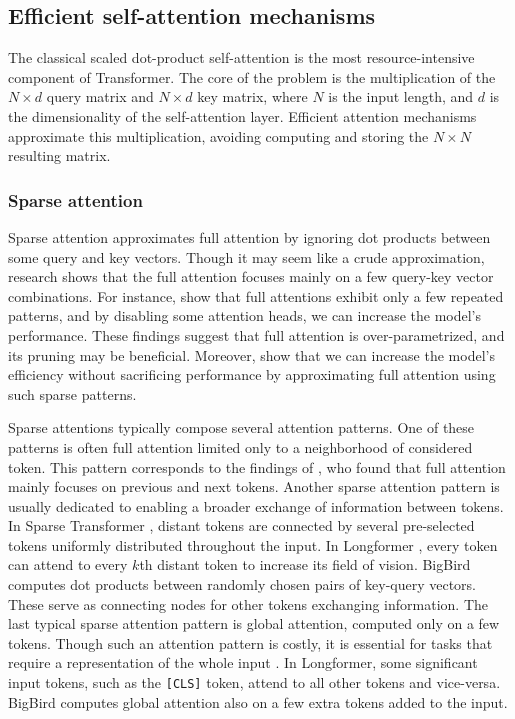 \subsection{Efficient self-attention mechanisms}\label{section:efficient_self_attn}


The classical scaled dot-product self-attention \citep{vaswani2017attention} is
the most resource-intensive component of Transformer. The core of the
problem is the multiplication of the $N\times d$ query matrix and $N\times d$ key
matrix, where $N$ is the input length, and $d$ is the dimensionality of the
self-attention layer. Efficient attention mechanisms approximate this
multiplication, avoiding computing and storing the $N\times N$ resulting
matrix.

\subsubsection{Sparse attention}

Sparse attention approximates full attention by ignoring dot products between
some query and key vectors. Though it may seem like a crude approximation,
research shows that the full attention focuses mainly on a few query-key vector
combinations. For instance, \cite{kovaleva2019revealing} show that full
attentions exhibit only a few repeated patterns, and by disabling some attention
heads, we can increase the model's performance. These findings suggest that full
attention is over-parametrized, and its pruning may be beneficial. Moreover,
\cite{child2019generating} show that we can increase the model's efficiency without
sacrificing performance by approximating full attention using such sparse patterns.

Sparse attentions typically compose several attention patterns. One of these
patterns is often full attention limited only to a neighborhood of considered
token. This pattern corresponds to the findings of \cite{clark2019does}, who
found that full attention mainly focuses on previous and next tokens. Another
sparse attention pattern is usually dedicated to enabling a broader exchange of
information between tokens. In Sparse Transformer \citep{child2019generating},
distant tokens are connected by several pre-selected tokens uniformly
distributed throughout the input. In Longformer \citep{beltagy2020longformer},
every token can attend to every $k$th distant token to increase its field of
vision. BigBird \citep{zaheer2020big} computes dot products between randomly
chosen pairs of key-query vectors. These serve as connecting nodes for other
tokens exchanging information. The last typical sparse attention pattern is 
global attention, computed only on a few tokens. Though such an attention
pattern is costly, it is essential for tasks that require a representation of
the whole input \citep{beltagy2020longformer}. In Longformer, some significant
input tokens, such as the \texttt{[CLS]} token, attend to all other tokens and
vice-versa. BigBird computes global attention also on a few extra tokens added
to the input.

